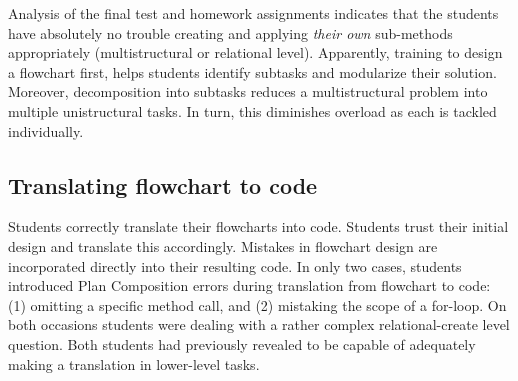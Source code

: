 Analysis of the final test and homework assignments indicates that the students
have absolutely no trouble creating and applying \emph{their own} sub-methods
appropriately (multistructural or relational level). Apparently, training to
design a flowchart first, helps students identify subtasks and modularize
their solution. Moreover, decomposition into subtasks reduces a
multistructural problem into multiple unistructural tasks. In turn, this
diminishes overload as each is tackled individually.

\subsection*{Translating flowchart to code}

Students correctly translate their flowcharts into code. Students trust their
initial design and translate this accordingly. Mistakes in flowchart design
are incorporated directly into their resulting code. In only two cases,
students introduced Plan Composition errors during translation from flowchart
to code: (1) omitting a specific method call, and (2) mistaking the scope of
a for-loop. On both occasions students were dealing with a rather complex
relational-create level question. Both students had previously revealed to be
capable of adequately making a translation in lower-level tasks.

%
%



%
%
